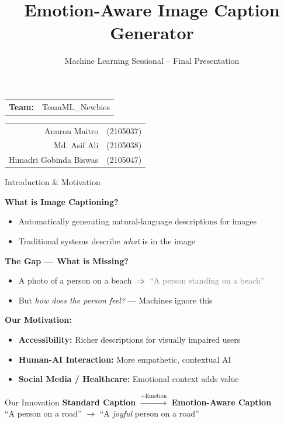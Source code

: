 \documentclass{beamer}
\title{Emotion-Aware Image Caption Generator}
\subtitle{Machine Learning Sessional -- Final Presentation}
\author{}
\date{}
\newcommand{\authorinfo}{
    \begin{tabular}{rl}
    \textbf{Team:} & TeamML\_Newbies \\[0.3em]
    \end{tabular}

    \vspace{0.25cm}

    \begin{tabular}{rl}
    Anuron Maitro          & (2105037) \\
    Md. Asif Ali           & (2105038) \\
    Himadri Gobinda Biswas & (2105047)
    \end{tabular}
}
\begin{document}

\begin{frame}
    \titlepage
    \vspace{-0.8cm}
    \begin{center}
        \authorinfo
    \end{center}
\end{frame}

\begin{frame}{Introduction \& Motivation}

    \textbf{What is Image Captioning?}
    \begin{itemize}
        \item Automatically generating natural-language descriptions for images
        \item Traditional systems describe \textit{what} is in the image
    \end{itemize}

    \vspace{0.3cm}
    \textbf{The Gap — What is Missing?}
    \begin{itemize}
        \item A photo of a person on a beach $\Rightarrow$
              \textcolor{gray}{``A person standing on a beach''}
        \item But \textit{how does the person feel?} — Machines ignore this
    \end{itemize}

    \vspace{0.3cm}
    \textbf{Our Motivation:}
    \begin{itemize}
        \item \textbf{Accessibility:} Richer descriptions for visually impaired users
        \item \textbf{Human-AI Interaction:} More empathetic, contextual AI
        \item \textbf{Social Media / Healthcare:} Emotional context adds value
    \end{itemize}

    \vspace{0.2cm}
    \begin{block}{Our Innovation}
        \centering
        \textbf{Standard Caption} $\xrightarrow{\text{+Emotion}}$
        \textbf{Emotion-Aware Caption}\\[0.1em]
        \small ``A person on a road'' $\rightarrow$
        ``A \textit{joyful} person on a road''
    \end{block}
\end{frame}
\end{document}
